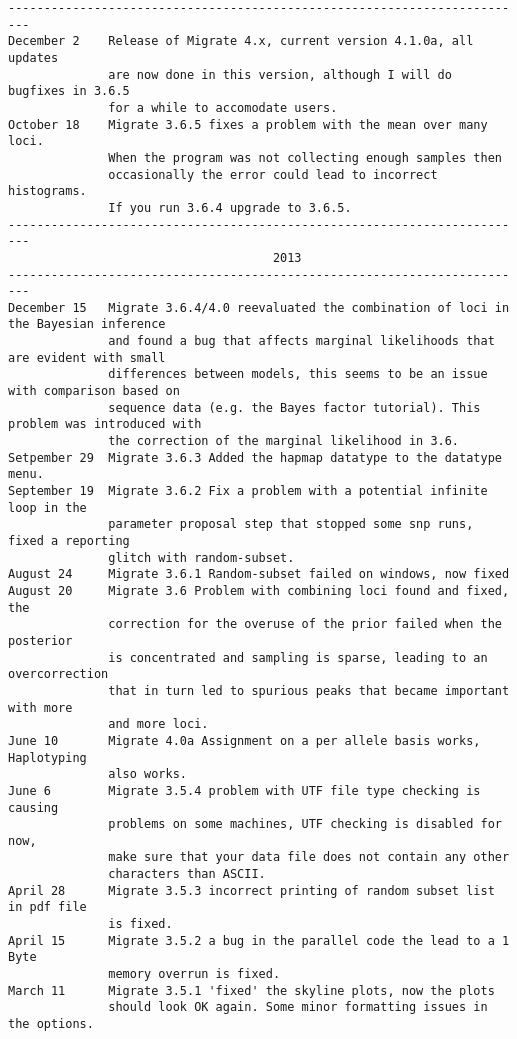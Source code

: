 \begin{small}
\begin{verbatim}
-------------------------------------------------------------------------
December 2    Release of Migrate 4.x, current version 4.1.0a, all updates
              are now done in this version, although I will do bugfixes in 3.6.5
              for a while to accomodate users.
October 18    Migrate 3.6.5 fixes a problem with the mean over many loci.
              When the program was not collecting enough samples then 
              occasionally the error could lead to incorrect histograms.
              If you run 3.6.4 upgrade to 3.6.5.
-------------------------------------------------------------------------
                                     2013
-------------------------------------------------------------------------
December 15   Migrate 3.6.4/4.0 reevaluated the combination of loci in the Bayesian inference
              and found a bug that affects marginal likelihoods that are evident with small
              differences between models, this seems to be an issue with comparison based on 
              sequence data (e.g. the Bayes factor tutorial). This problem was introduced with
              the correction of the marginal likelihood in 3.6.
Setpember 29  Migrate 3.6.3 Added the hapmap datatype to the datatype menu.
September 19  Migrate 3.6.2 Fix a problem with a potential infinite loop in the
              parameter proposal step that stopped some snp runs, fixed a reporting
              glitch with random-subset.
August 24     Migrate 3.6.1 Random-subset failed on windows, now fixed 
August 20     Migrate 3.6 Problem with combining loci found and fixed, the 
              correction for the overuse of the prior failed when the posterior
              is concentrated and sampling is sparse, leading to an overcorrection
              that in turn led to spurious peaks that became important with more
              and more loci.
June 10       Migrate 4.0a Assignment on a per allele basis works, Haplotyping
              also works.
June 6        Migrate 3.5.4 problem with UTF file type checking is causing
              problems on some machines, UTF checking is disabled for now,
              make sure that your data file does not contain any other
              characters than ASCII.
April 28      Migrate 3.5.3 incorrect printing of random subset list in pdf file
              is fixed. 
April 15      Migrate 3.5.2 a bug in the parallel code the lead to a 1 Byte
              memory overrun is fixed.
March 11      Migrate 3.5.1 'fixed' the skyline plots, now the plots
              should look OK again. Some minor formatting issues in the options.

\end{verbatim}
\end{small}
